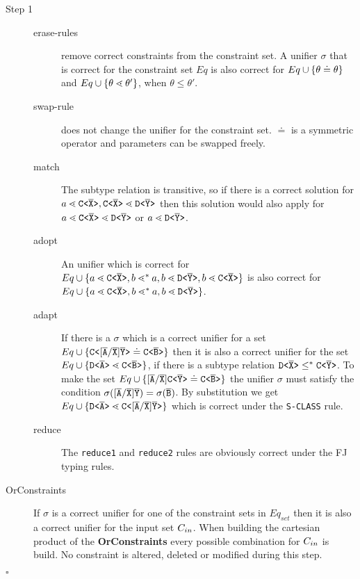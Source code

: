 \begin{description}
\item[Step 1]
\begin{description}
\item[erase-rules] remove correct constraints from the constraint set.
A unifier $\sigma$ that is correct for the constraint set $Eq$
is also correct for $Eq \cup \{ \theta \doteq \theta \}$
and $Eq \cup \{ \theta \lessdot \theta' \}$, when $\theta \leq \theta'$.
\item[swap-rule] does not change the unifier for the constraint set.
$\doteq$ is a symmetric operator and parameters can be swapped freely.
\item[match] The subtype relation is transitive, so if there is a correct solution for
$a \lessdot \mathtt{C \texttt{<} \overline{\tt X} \texttt{>} }, \mathtt{C \texttt{<} \overline{\tt X} \texttt{>} } \lessdot \mathtt{D \texttt{<} \overline{\tt Y} \texttt{>} }$
then this solution would also apply for $a \lessdot \mathtt{C \texttt{<} \overline{\tt X} \texttt{>} } \lessdot \mathtt{D \texttt{<} \overline{\tt Y} \texttt{>} }$
or $a \lessdot \mathtt{D \texttt{<} \overline{\tt Y} \texttt{>} }$.
\item[adopt] An unifier which is correct for $Eq \cup \{ a \lessdot \mathtt{C \texttt{<} \overline{\tt X} \texttt{>} }, b \lessdot^* a, b \lessdot \mathtt{D \texttt{<} \overline{\tt Y} \texttt{>} }, b \lessdot \mathtt{C \texttt{<} \overline{\tt X} \texttt{>} } \}$
is also correct for $Eq \cup \{ a \lessdot \mathtt{C \texttt{<} \overline{\tt X} \texttt{>} }, b \lessdot^* a, b \lessdot \mathtt{D \texttt{<} \overline{\tt Y} \texttt{>} } \}$.
\item[adapt] If there is a $\sigma$ which is a correct unifier for a set
$Eq \cup \{  \mathtt{C \texttt{<} [\overline{\tt A}/\overline{\tt X}]\overline{\tt Y} \texttt{>} } \doteq \mathtt{C \texttt{<} \overline{\tt B} \texttt{>} } \}$ then it is also
a correct unifier for the set $Eq \cup \{  \mathtt{D \texttt{<} \overline{\tt A} \texttt{>} } \lessdot \mathtt{C \texttt{<} \overline{\tt B} \texttt{>} } \}$,
if there is a subtype relation $\mathtt{D \texttt{<} \overline{\tt X} \texttt{>} } \leq^* \mathtt{C \texttt{<} \overline{\tt Y} \texttt{>} }$.
To make the set $Eq \cup \{  [\overline{\tt A}/\overline{\tt X}]\mathtt{C \texttt{<} \overline{\tt Y} \texttt{>} } \doteq \mathtt{C \texttt{<} \overline{\tt B} \texttt{>} } \}$ the unifier 
$\sigma$ must satisfy the condition $\sigma([\overline{\tt A}/\overline{\tt X}]\overline{\tt Y}) = \sigma(\overline{\tt B})$.
By substitution we get $Eq \cup \{  \mathtt{D \texttt{<} \overline{\tt A} \texttt{>} } \lessdot \mathtt{C \texttt{<} [\overline{\tt A}/\overline{\tt X}]\overline{\tt Y} \texttt{>} } \}$
which is correct under the \texttt{S-CLASS} rule.
\item[reduce] The \texttt{reduce1} and \texttt{reduce2} rules are obviously correct under the FJ typing rules.
\end{description}

\item[OrConstraints]
If $\sigma$ is a correct unifier for one of the constraint sets in $Eq_{set}$
then it is also a correct unifier for the input set $C_{in}$.
When building the cartesian product of the \textbf{OrConstraints} every possible
combination for $C_{in}$ is build.
No constraint is altered, deleted or modified during this step.
\end{description}
\hfill $\square$


